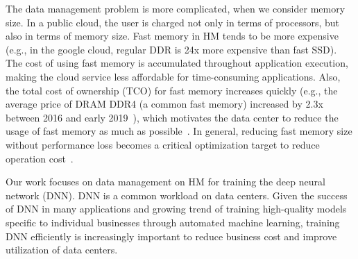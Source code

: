 The data management problem is more complicated, when we consider memory size. In a public cloud, the user is charged not only in terms of processors, but also in terms of memory size. Fast memory in HM tends to be more expensive (e.g., \textcolor{dong}{in the google cloud, regular DDR is 24x more expensive than fast SSD}). The cost of using fast memory is accumulated throughout application execution, making the cloud service less affordable for time-consuming applications. Also, the total cost of ownership (TCO) for fast memory increases quickly (e.g., the average price of DRAM DDR4 (a common fast memory) increased by 2.3x between 2016 and early 2019~\cite{ram_price, ram_price2}), which motivates the data center to reduce the usage of fast memory as much as possible~\cite{Eisenman:2018:RDF:3190508.3190524}. In general, reducing fast memory size without performance loss becomes a critical optimization target to reduce operation cost~\cite{DBLP:journals/corr/abs-1901-10938, Eisenman:2018:RDF:3190508.3190524}.  

Our work focuses on data management on HM for training the deep neural network (DNN). DNN is a common workload on data centers. %
Given the success of DNN in many applications and growing trend of training high-quality models specific to individual businesses through automated machine learning, training DNN efficiently is increasingly important to reduce business cost and improve utilization of data centers. 


